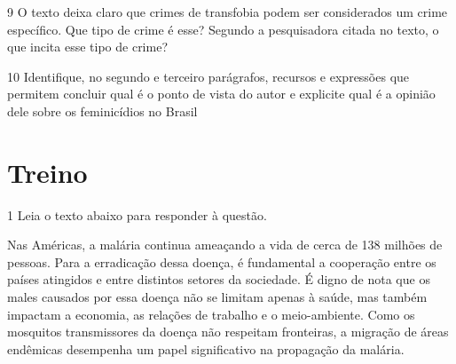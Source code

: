
\num{9} O texto deixa claro que crimes de transfobia podem ser considerados um crime específico.
Que tipo de crime é esse? Segundo a pesquisadora citada no texto, o que incita esse tipo
de crime? 


\num{10} Identifique, no segundo e terceiro parágrafos, recursos e expressões que permitem 
concluir qual é o ponto de vista do autor e explicite qual é a opinião dele sobre os feminicídios 
no Brasil   


\section{Treino}

\num{1} Leia o texto abaixo para responder à questão.

\begin{myquote}

Nas Américas, a malária continua ameaçando a vida de cerca de 138 milhões de pessoas.
Para a erradicação dessa doença, é fundamental a cooperação entre os países atingidos e 
entre distintos setores da sociedade. É digno de nota que os males causados por essa doença
não se limitam apenas à saúde, mas também impactam a economia, as relações de trabalho e 
o meio-ambiente. Como os mosquitos transmissores da doença não respeitam fronteiras, a migração
de áreas endêmicas desempenha um papel significativo na propagação da malária. 

\end{myquote}


